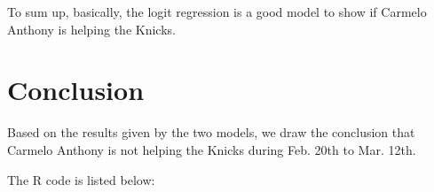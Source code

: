 \documentclass[12pt]{article}
\begin{document}
To sum up, basically, the logit regression is a good model to show if
Carmelo Anthony is helping the Knicks.

\section{Conclusion}

Based on the results given by the two models, we draw the conclusion
that Carmelo Anthony is not helping the Knicks during Feb. 20th to
Mar. 12th.

\appendix
\appendixpage
\addappheadtotoc

The R code is listed below:


\end{document}
